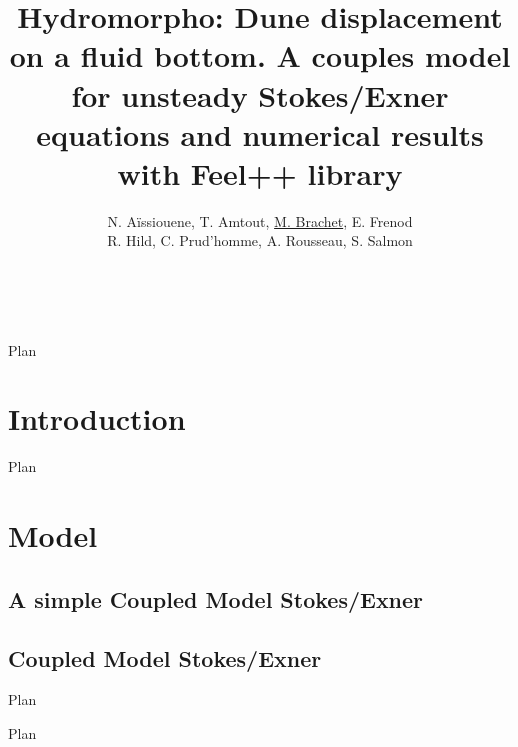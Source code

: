 \documentclass[notes]{beamer}
\title[Hydromorpho project]
{Hydromorpho: Dune displacement on a fluid bottom. A couples model for unsteady Stokes/Exner equations and numerical results with Feel++ library}
\author[M. Brachet]{ N. A\"issiouene, T. Amtout, \underline{M. Brachet}, E. Frenod \\ R. Hild, C. Prud'homme, A. Rousseau, S. Salmon}
\institute[CEMRACS2015]{CEMRACS 2015 - CIRM MARSEILLE}
\date{\mbox{~}}
\begin{document}
\begin{frame}
  \maketitle
  \initclock
\end{frame}
\date{\tdtime}

\begin{frame}{Plan}
  \tableofcontents
\end{frame}

\section{Introduction}


\begin{frame}{Plan}
  \tableofcontents
\end{frame}

\section{Model}


\subsection{A simple Coupled Model Stokes/Exner}





\subsection{Coupled Model Stokes/Exner}


\begin{frame}{Plan}
  \tableofcontents
\end{frame}



\begin{frame}{Plan}
  \tableofcontents
\end{frame}

\end{document}
